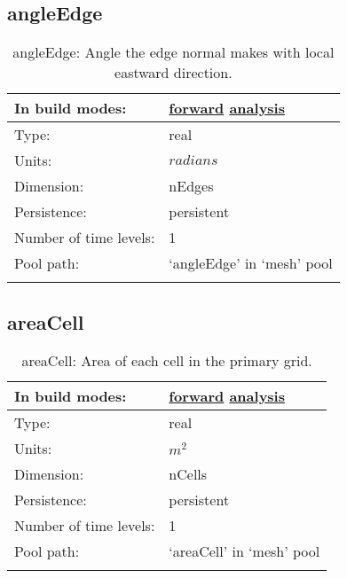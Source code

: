\subsection[angleEdge]{angleEdge}
\label{subsec:var_sec_mesh_angleEdge}
\begin{center}
\begin{longtable}{| p{2.0in} | p{4.0in} |}
        \hline 
        In build modes: & \hyperref[subsec:forward_var_tab_mesh]{forward} \hyperref[subsec:analysis_var_tab_mesh]{analysis} \\
        \hline 
        Type: & real \\
        \hline 
        Units: & $radians$ \\
        \hline 
        Dimension: & nEdges \\
        \hline 
        Persistence: & persistent \\
        \hline 
        Number of time levels: & 1 \\
        \hline 
            Pool path: & `angleEdge' in `mesh' pool \\
		 \hline 
    \caption{angleEdge: Angle the edge normal makes with local eastward direction.}
\end{longtable}
\end{center}
\subsection[areaCell]{areaCell}
\label{subsec:var_sec_mesh_areaCell}
\begin{center}
\begin{longtable}{| p{2.0in} | p{4.0in} |}
        \hline 
        In build modes: & \hyperref[subsec:forward_var_tab_mesh]{forward} \hyperref[subsec:analysis_var_tab_mesh]{analysis} \\
        \hline 
        Type: & real \\
        \hline 
        Units: & $m^2$ \\
        \hline 
        Dimension: & nCells \\
        \hline 
        Persistence: & persistent \\
        \hline 
        Number of time levels: & 1 \\
        \hline 
            Pool path: & `areaCell' in `mesh' pool \\
		 \hline 
    \caption{areaCell: Area of each cell in the primary grid.}
\end{longtable}
\end{center}
